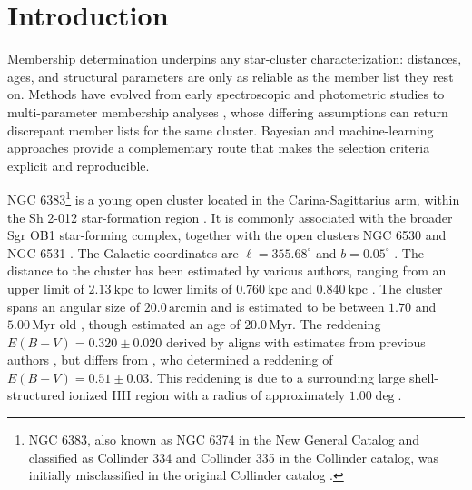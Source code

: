 \documentclass{aa}
\begin{document}


   \maketitle
\nolinenumbers

\section{Introduction}\label{S_intro}
Membership determination underpins any star-cluster characterization: distances, ages, and structural parameters are only as reliable as the member list they rest on. Methods have evolved from early spectroscopic and photometric studies \citep[e.g.][]{1930LicOB..14..154T,1949ApJ...110..117S,1968ArA.....5....1L,1978MNRAS.182..607F} to multi-parameter membership analyses \citep{1989MNRAS.236..263P,1991MNRAS.249...76B,2005AA...438.1163K,2007AA...462..157P,2018AA...610A..30A}, whose differing assumptions can return discrepant member lists for the same cluster. Bayesian and machine-learning approaches provide a complementary route that makes the selection criteria explicit and reproducible.

NGC 6383\footnote{NGC 6383, also known as NGC 6374 in the New General Catalog \citep{2008hsf2.book..497R} and classified as Collinder 334 and Collinder 335 in the Collinder catalog, was initially misclassified in the original Collinder catalog \citep{1931AnLun...2....1C}.} is a young open cluster located in the Carina-Sagittarius arm, within the Sh 2-012 star-formation region \citep{1959ApJS....4..257S}. It is commonly associated with the broader Sgr OB1 star-forming complex, together with the open clusters NGC 6530 and NGC 6531 \citep{2008hsf2.book..497R}. The Galactic coordinates are $\ell = 355.68^{\circ}$ and $b = 0.05^{\circ}$ \citep{2017A&A...600A.106C}. The distance to the cluster has been estimated by various authors, ranging from an upper limit of $2.13~\mathrm{kpc}$ \citep{1930LicOB..14..154T} to lower limits of $0.760~\mathrm{kpc}$ \citep{1949ApJ...110..117S} and $0.840~\mathrm{kpc}$ \citep{2018AA...610A..30A}. The cluster spans an angular size of $20.0\,\mathrm{arcmin}$ \citep{2013A&A...560A..76M} and is estimated to be between $1.70$ and $5.00\,\mathrm{Myr}$ old \citep{1978MNRAS.182..607F,1989MNRAS.236..263P,1991MNRAS.249...76B,2005AA...438.1163K,2007AA...462..157P}, though \citet{1968ArA.....5....1L} estimated an age of $20.0\,\mathrm{Myr}$. The reddening $E(B-V) = 0.320 \pm 0.020$ derived by \citet{2008hsf2.book..497R} aligns with estimates from previous authors \citep{1971AAS....4..241B,1978MNRAS.182..607F,1978MNRAS.184..661L,1985AA...151..391T,1989MNRAS.236..263P,1994RMxAA..29..141F,2007AA...462..157P}, but differs from \citet{2018AA...610A..30A}, who determined a reddening of $E(B-V) = 0.51 \pm 0.03$. This reddening is due to a surrounding large shell-structured ionized HII region with a radius of approximately $1.00\deg$.
\end{document}
